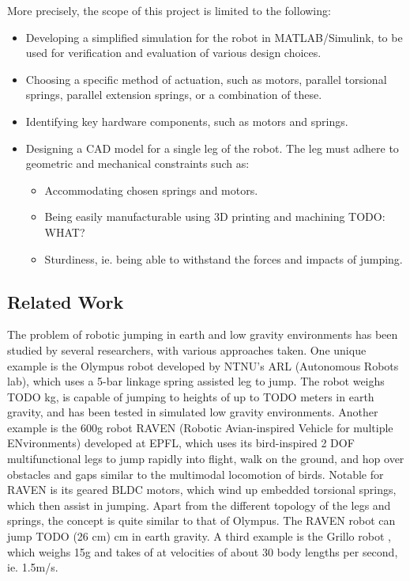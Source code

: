 More precisely, the scope of this project is limited to the following:
\begin{itemize}
    \item Developing a simplified simulation for the robot in MATLAB/Simulink, to be used for verification and evaluation of various design choices. 
    \item Choosing a specific method of actuation, such as motors, parallel torsional springs, parallel extension springs, or a combination of these.
    \item Identifying key hardware components, such as motors and springs. 
    \item Designing a CAD model for a single leg of the robot. The leg must adhere to geometric and mechanical constraints such as:
    \begin{itemize}
    \item Accommodating chosen springs and motors. 
    \item Being easily manufacturable using 3D printing and machining TODO: WHAT?
    \item Sturdiness, ie. being able to withstand the forces and impacts of jumping.
    \end{itemize}
\end{itemize}

\subsection{Related Work}
\label{sec:related_work}

The problem of robotic jumping in earth and low gravity environments has been studied by several researchers, with various approaches taken. One unique example is the Olympus robot \cite{OLYMPUS1} \cite{OLYMPUS2} developed by NTNU's ARL (Autonomous Robots lab), which uses a 5-bar linkage spring assisted leg to jump. The robot weighs TODO kg, is capable of jumping to heights of up to TODO meters in earth gravity, and has been tested in simulated low gravity environments. Another example is the 600g robot RAVEN (Robotic Avian-inspired Vehicle for multiple ENvironments) \cite{RAVEN} developed at EPFL, which uses its bird-inspired 2 DOF multifunctional legs to jump rapidly into flight, walk on the ground, and hop over obstacles and gaps similar to the multimodal locomotion of birds. Notable for RAVEN is its geared BLDC motors, which wind up embedded torsional springs, which then assist in jumping. Apart from the different topology of the legs and springs, the concept is quite similar to that of Olympus. The RAVEN robot can jump TODO (26 cm) cm in earth gravity. A third example is the Grillo robot \cite{GRILLO}, which weighs 15g and takes of at velocities of about 30 body lengths per second, ie. 1.5m/s. 

